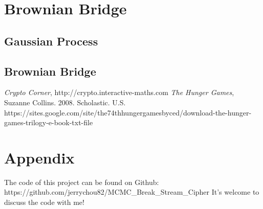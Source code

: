 \documentclass[a4paper, 11pt]{article} %
\begin{document}
\section{Brownian Bridge}
\subsection{Gaussian Process}
\subsection{Brownian Bridge}




\begin{thebibliography}{9}

\emph{Crypto Corner},
http://crypto.interactive-maths.com
\emph{The Hunger Games}, Suzanne Collins. 2008. Scholastic. U.S.
https://sites.google.com/site/the74thhungergamesbyced/download-the-hunger-games-trilogy-e-book-txt-file
\end{thebibliography}

\section*{Appendix}
The code of this project can be found on Github: https://github.com/jerrychou82/MCMC\_Break\_Stream\_Cipher
It's welcome to discuss the code with me!
\end{document}
